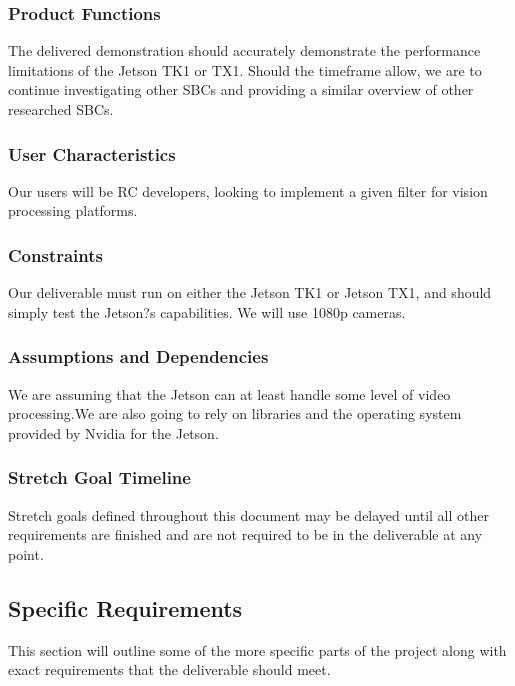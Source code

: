 \subsubsection{Product Functions}
The delivered demonstration should accurately demonstrate the performance limitations of the Jetson TK1 or TX1. Should the timeframe allow, we are to continue investigating other SBCs and providing a similar overview of other researched SBCs.\\

\subsubsection{User Characteristics}
Our users will be RC developers, looking to implement a given filter for vision processing platforms.\\

\subsubsection{Constraints}
Our deliverable must run on either the Jetson TK1 or Jetson TX1, and should simply test the Jetson?s capabilities. We will use 1080p cameras.\\

\subsubsection{Assumptions and Dependencies}
We are assuming that the Jetson can at least handle some level of video processing.We are also going to rely on libraries and the operating system provided by Nvidia for the Jetson.\\

\subsubsection{Stretch Goal Timeline}
Stretch goals defined throughout this document may be delayed until all other requirements are finished and are not required to be in the deliverable at any point.

\subsection{Specific Requirements}
This section will outline some of the more specific parts of the project along with exact requirements that the deliverable should meet.\\

